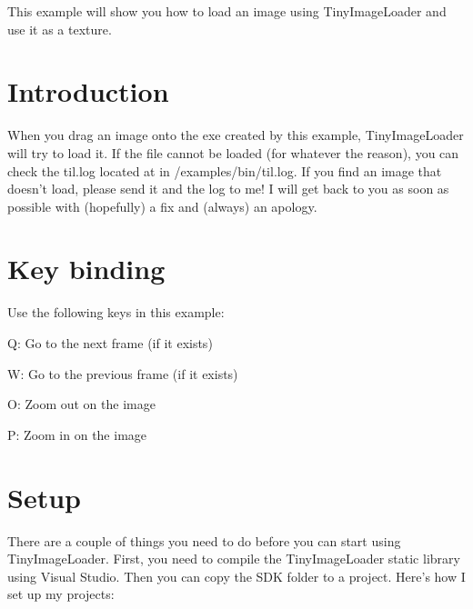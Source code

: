 This example will show you how to load an image using TinyImageLoader and use it as a texture.\hypertarget{example1_intro}{}\section{Introduction}\label{example1_intro}
When you drag an image onto the exe created by this example, TinyImageLoader will try to load it. If the file cannot be loaded (for whatever the reason), you can check the til.log located at in /examples/bin/til.log. If you find an image that doesn't load, please send it and the log to me! I will get back to you as soon as possible with (hopefully) a fix and (always) an apology.\hypertarget{example1_input}{}\section{Key binding}\label{example1_input}
Use the following keys in this example:
\begin{DoxyItemize}
\item Q: Go to the next frame (if it exists)
\item W: Go to the previous frame (if it exists)
\item O: Zoom out on the image
\item P: Zoom in on the image
\end{DoxyItemize}\hypertarget{example1_setup}{}\section{Setup}\label{example1_setup}
There are a couple of things you need to do before you can start using TinyImageLoader. First, you need to compile the TinyImageLoader static library using Visual Studio. Then you can copy the SDK folder to a project. Here's how I set up my projects:
